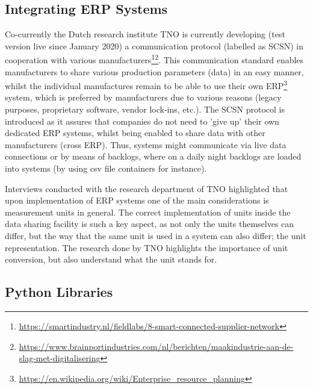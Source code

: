 \documentclass[sigchi, nonacm]{acmart}
\begin{document}
\subsection{Integrating ERP Systems}
Co-currently the Dutch research institute TNO is currently developing (test version live since January 2020) a communication protocol (labelled as SCSN) in cooperation with various manufacturers\footnote{\raggedright\url{https://smartindustry.nl/fieldlabs/8-smart-connected-supplier-network}}\footnote{\raggedright\url{https://www.brainportindustries.com/nl/berichten/maakindustrie-aan-de-slag-met-digitalisering}}. This communication standard enables manufacturers to share various production parameters (data) in an easy manner, whilst the individual manufactures remain to be able to use their own ERP\footnote{\raggedright\url{https://en.wikipedia.org/wiki/Enterprise_resource_planning}} system, which is preferred by manufacturers due to various reasons (legacy purposes, proprietary software, vendor lock-ins, etc.). The SCSN protocol is introduced as it assures that companies do not need to 'give up' their own dedicated ERP systems, whilst being enabled to share data with other manufacturers (cross ERP). Thus, systems might communicate via live data connections or by means of backlogs, where on a daily night backlogs are loaded into systems (by using csv file containers for instance).

Interviews conducted with the research department of TNO highlighted that upon implementation of ERP systems one of the main considerations is measurement units in general. The correct implementation of units inside the data sharing facility is such a key aspect, as not only the units themselves can differ, but the way that the same unit is used in a system can also differ; the unit representation. The research done by TNO highlights the importance of unit conversion, but also understand what the unit stands for.

\subsection{Python Libraries}
\end{document}
